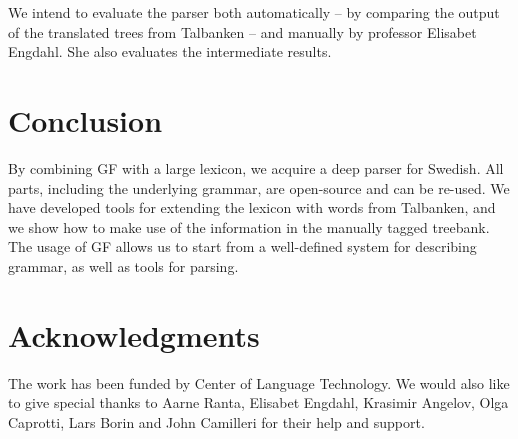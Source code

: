 \documentclass[submission]{eptcs} %
\begin{document}
We intend to evaluate the parser both automatically -- by comparing the output of
the translated trees from Talbanken -- and manually by professor Elisabet Engdahl.
She also evaluates the intermediate results.


\section{Conclusion}
By combining GF with a large lexicon, we acquire a deep parser for 
Swedish. All parts, including the underlying grammar, are open-source and can be re-used.
We have developed tools for extending the lexicon with words from Talbanken,
and we show how to make use of the information in the manually tagged
treebank.
The usage of GF allows us to start from
a well-defined system for describing grammar, as well as tools for
parsing.

\section{Acknowledgments}
The work has been funded by Center of Language Technology.
We would also like to give special thanks to Aarne Ranta,
Elisabet Engdahl, Krasimir Angelov, Olga Caprotti, Lars Borin and John Camilleri for their help
and support.



\nocite{*}


\end{document}

